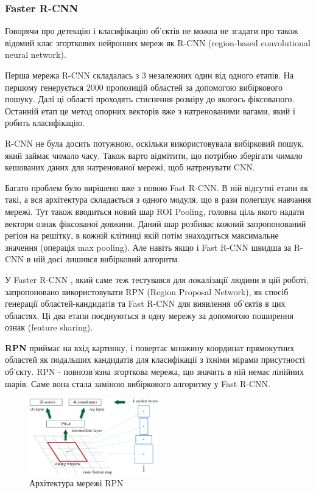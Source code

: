 \subsubsection{Faster R-CNN}

Говорячи про детекцію і класифікацію об'єктів не можна не згадати про також відомий
клас згорткових нейронних мереж як R-CNN (region-based convolutional neural network).

Перша мережа R-CNN складалась з 3 незалежних один від одного етапів.
На першому генерується 2000 пропозицій областей за допомогою
вибіркового пошуку. Далі ці області проходять стиснення розміру до якогось
фіксованого. Останній етап це метод опорних векторів вже з натренованими 
вагами, який і робить класифікацію.

R-CNN не була досить потужною, оскільки використовувала вибірковий пошук, 
який займає чимало часу. Також варто відмітити, що потрібно зберігати чимало
кешованих даних для натренованої мережі, щоб натренувати CNN.

Багато проблем було вирішено вже з новою Fast R-CNN. В ній відсутні етапи як такі,
а вся архітектура складається з одного модуля, що в рази полегшує
навчання мережі. Тут також вводиться новий шар ROI Pooling, головна ціль якого 
надати вектори ознак фіксованої довжини. Даний шар розбиває кожний запропонований 
регіон на решітку, в кожній клітинці якій потім знаходиться максимальне значення
(операція max pooling). Але навіть якщо і  Fast R-CNN швидша за R-CNN в ній досі 
лишився вибірковий алгоритм.

У Faster R-CNN \cite{faster_rcnn}, який саме теж тестувався для локалізації людини в
цій роботі, запропоновано використовувати RPN (Region Proposal Network), як спосіб 
генерації областей-кандидатів та Fast R-CNN для виявлення об'єктів в цих областях.
Ці два етапи поєднуються в одну мережу за допомогою поширення ознак (feature sharing).


\textbf{RPN}  приймає на вхід картинку, і повертає множину координат прямокутних областей як подальших
кандидатів для класифікації з їхніми мірами присутності об'єкту. RPN - повнозв'язна 
згорткова мережа, що значить в ній немає лінійних шарів. Саме вона стала заміною
вибіркового алгоритму у Fast R-CNN. 

\begin{figure}[H]
    \centering
    \includegraphics[width=0.5\textwidth]{images/cnn_faster_rcnn_rpn}
    \caption{Архітектура мережі RPN \cite{faster_rcnn}
        \label{fig:cnn:faster_rcnn_rpn}
    }
\end{figure}

